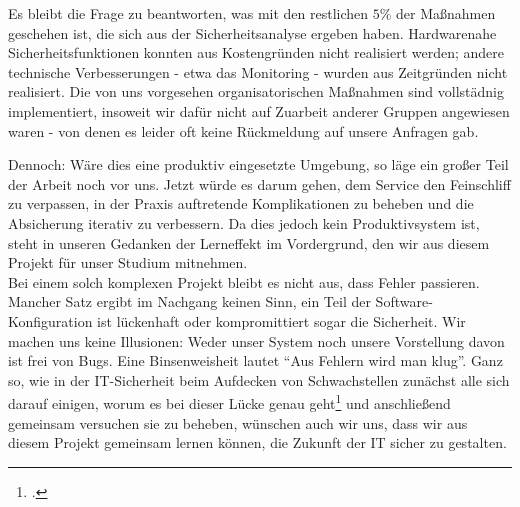 Es bleibt die Frage zu beantworten, was mit den restlichen $5\%$ der Maßnahmen geschehen ist, die sich aus der Sicherheitsanalyse ergeben haben. Hardwarenahe Sicherheitsfunktionen konnten aus Kostengründen nicht realisiert werden; andere technische Verbesserungen - etwa das Monitoring - wurden aus Zeitgründen nicht realisiert. Die von uns vorgesehen organisatorischen Maßnahmen sind vollstädnig implementiert, insoweit wir dafür nicht auf Zuarbeit anderer Gruppen angewiesen waren - von denen es leider oft keine Rückmeldung auf unsere Anfragen gab.

Dennoch: Wäre dies eine produktiv eingesetzte Umgebung, so läge ein großer Teil der Arbeit noch vor uns. Jetzt würde es darum gehen, dem Service den Feinschliff zu verpassen, in der Praxis auftretende Komplikationen zu beheben und die Absicherung iterativ zu verbessern. Da dies jedoch kein Produktivsystem ist, steht in unseren Gedanken der Lerneffekt im Vordergrund, den wir aus diesem Projekt für unser Studium mitnehmen. \\

Bei einem solch komplexen Projekt bleibt es nicht aus, dass Fehler passieren. Mancher Satz ergibt im Nachgang keinen Sinn, ein Teil der Software-Konfiguration ist lückenhaft oder kompromittiert sogar die Sicherheit. Wir machen uns keine Illusionen: Weder unser System noch unsere Vorstellung davon ist frei von Bugs. Eine Binsenweisheit lautet "`Aus Fehlern wird man klug"'. Ganz so, wie in der IT-Sicherheit beim Aufdecken von Schwachstellen zunächst alle sich darauf einigen, worum es bei dieser Lücke genau geht\footcite{wikiCVE} und anschließend gemeinsam versuchen sie zu beheben, wünschen auch wir uns, dass wir aus diesem Projekt gemeinsam lernen können, die Zukunft der IT sicher zu gestalten.


\newpage

